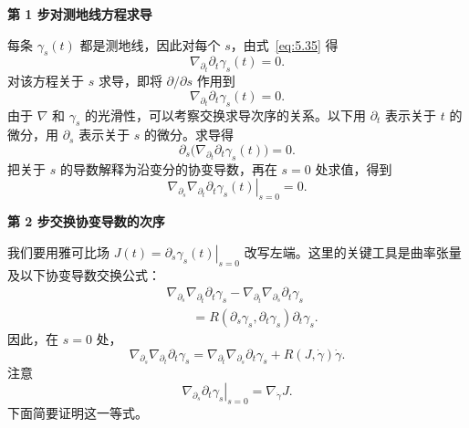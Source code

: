 \textbf{第 1 步\quad 对测地线方程求导}\par
每条 $\gamma_s(t)$ 都是测地线，因此对每个 $s$，由式~\eqref{eq:5.35} 得
\[
  \nabla_{\partial_t}\partial_t\gamma_s(t)=0.
\]
对该方程关于 $s$ 求导，即将 $\partial/\partial s$ 作用到
\[
  \nabla_{\partial_t}\partial_t\gamma_s(t)=0.
\]
由于 $\nabla$ 和 $\gamma_s$ 的光滑性，可以考察交换求导次序的关系。以下用 $\partial_t$ 表示关于 $t$ 的微分，用 $\partial_s$ 表示关于 $s$ 的微分。求导得
\[
  \partial_s\bigl(\nabla_{\partial_t}\partial_t\gamma_s(t)\bigr)=0.
\]
把关于 $s$ 的导数解释为沿变分的协变导数，再在 $s=0$ 处求值，得到
\begin{equation*}
  \left.\nabla_{\partial_s}\nabla_{\partial_t}\partial_t\gamma_s(t)\right|_{s=0}=0.
  \tag{5.37}\label{eq:5.37}
\end{equation*}

\textbf{第 2 步\quad 交换协变导数的次序}\par
我们要用雅可比场 $J(t)=\left.\partial_s\gamma_s(t)\right|_{s=0}$ 改写左端。这里的关键工具是曲率张量及以下协变导数交换公式：
\begin{equation*}
  \begin{aligned}
    &\nabla_{\partial_s}\nabla_{\partial_t}\partial_t\gamma_s
       -\nabla_{\partial_t}\nabla_{\partial_s}\partial_t\gamma_s\\
    &\qquad=R(\partial_s\gamma_s,\partial_t\gamma_s)\partial_t\gamma_s.
  \end{aligned}
  \tag{5.38}\label{eq:5.38}
\end{equation*}
因此，在 $s=0$ 处，
\begin{equation*}
  \nabla_{\partial_s}\nabla_{\partial_t}\partial_t\gamma_s
    =\nabla_{\partial_t}\nabla_{\partial_s}\partial_t\gamma_s
       +R(J,\dot\gamma)\dot\gamma.
  \tag{5.39}\label{eq:5.39}
\end{equation*}
注意
\[
  \left.\nabla_{\partial_s}\partial_t\gamma_s\right|_{s=0}
    =\nabla_{\dot\gamma}J.
\]
下面简要证明这一等式。

